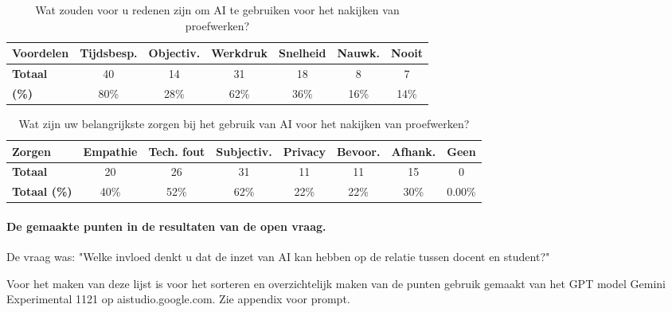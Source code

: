 \documentclass[12pt]{article}
\begin{document}
\noindent
\begin{table}[H]
    \caption{Wat zouden voor u redenen zijn om AI te gebruiken voor het nakijken van proefwerken? }
    \begin{tabular}{l c c c c c c}
        \toprule
        \textbf{Voordelen} & \textbf{Tijdsbesp.} & \textbf{Objectiv.} & \textbf{Werkdruk} & \textbf{Snelheid} & \textbf{Nauwk.} & \textbf{Nooit} \\
        \midrule
        \textbf{Totaal} & 40 & 14 & 31 & 18 & 8 & 7 \\
        \bottomrule
        \textbf{(\%)} & 80\% & 28\% & 62\% & 36\% & 16\% & 14\% \\
        \bottomrule
    \end{tabular}
\end{table}


\noindent
\begin{table}[H]
    \caption{Wat zijn uw belangrijkste zorgen bij het gebruik van AI voor het nakijken van proefwerken? }
    \begin{tabular}{l c c c c c c c}
        \toprule
        \textbf{Zorgen} & \textbf{Empathie} & \textbf{Tech. fout} & \textbf{Subjectiv.} & \textbf{Privacy} & \textbf{Bevoor.} & \textbf{Afhank.} & \textbf{Geen} \\
        \midrule
        \textbf{Totaal} & 20 & 26 & 31 & 11 & 11 & 15 & 0  \\
        \textbf{Totaal (\%)} & 40\% & 52\% & 62\% & 22\% & 22\% & 30\% & 0.00\% \\
        \bottomrule
    \end{tabular}
\end{table}

\paragraph*{De gemaakte punten in de resultaten van de open vraag.}

De vraag was: "Welke invloed denkt u dat de inzet van AI kan hebben op de relatie tussen docent en student?"

Voor het maken van deze lijst is voor het sorteren en overzichtelijk maken van de punten gebruik gemaakt van het GPT model Gemini Experimental 1121 op aistudio.google.com. Zie appendix voor prompt.
\end{document}
